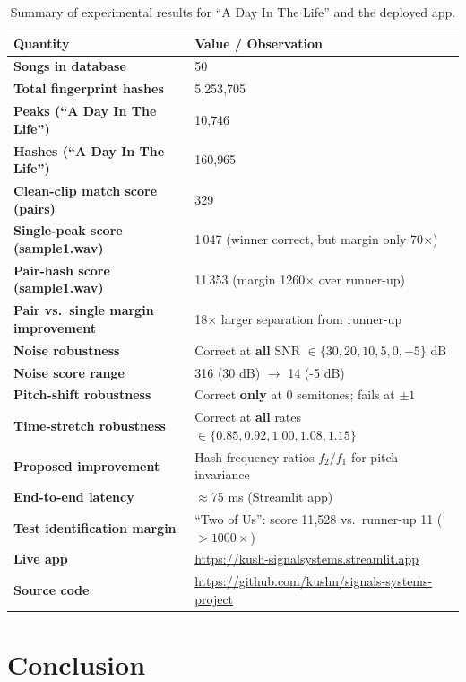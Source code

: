 \documentclass[11pt,a4paper]{article}
\begin{document}
\begin{table}[H]
\centering\small
\renewcommand{\arraystretch}{1.25}
\begin{tabular}{>{\bfseries}p{6.5cm} p{8.5cm}}
\toprule
\rowcolor{tabhead!20}
\textbf{Quantity} & \textbf{Value / Observation} \\
\midrule
Songs in database           & 50 \\
Total fingerprint hashes    & 5{,}253{,}705 \\
Peaks (``A Day In The Life'') & 10{,}746 \\
Hashes (``A Day In The Life'') & 160{,}965 \\
Clean-clip match score (pairs) & 329 \\
Single-peak score (sample1.wav)   & 1\,047 (winner correct, but margin only 70$\times$) \\
Pair-hash score (sample1.wav)     & 11\,353 (margin 1260$\times$ over runner-up) \\
Pair vs.\ single margin improvement & 18$\times$ larger separation from runner-up \\
Noise robustness            & Correct at \textbf{all} SNR $\in \{30,20,10,5,0,-5\}$ dB \\
Noise score range           & 316 (30 dB) \ensuremath{\to} 14 (-5 dB) \\
Pitch-shift robustness      & Correct \textbf{only} at 0 semitones; fails at $\pm1$ \\
Time-stretch robustness     & Correct at \textbf{all} rates $\in \{0.85,0.92,1.00,1.08,1.15\}$ \\
Proposed improvement        & Hash frequency ratios $f_2/f_1$ for pitch invariance \\
End-to-end latency          & $\approx$75 ms (Streamlit app) \\
Test identification margin  & ``Two of Us'': score 11{,}528 vs.\ runner-up 11 ($>1000\times$) \\
Live app                    & \url{https://kush-signalsystems.streamlit.app} \\
Source code                 & \url{https://github.com/kushn/signals-systems-project} \\
\bottomrule
\end{tabular}
\caption{Summary of experimental results for ``A Day In The Life'' and the deployed app.}
\label{tab:summary}
\end{table}

\section{Conclusion}
\end{document}
